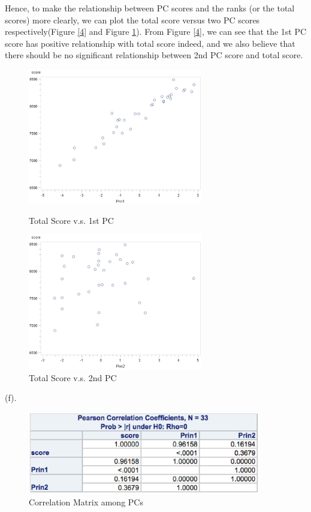 \documentclass[letterpaper, 12pt]{article}
\begin{document}
Hence, to make the relationship between PC scores and the ranks (or the total scores) more clearly, we can plot the total score versus two PC scores respectively(Figure \ref{4} and Figure \ref{5}). From Figure \ref{4}, we can see that the 1st PC score has positive relationship with total score indeed, and we also believe that there should be no significant relationship between 2nd PC score and total score.
\begin{figure}[htbp]
\begin{minipage}[t]{0.5\linewidth}
\centering
\includegraphics[width=3in]{7-4.eps}
\caption{Total Score v.s. 1st PC}\label{4}
\end{minipage}
\begin{minipage}[t]{0.5\linewidth}
\centering
\includegraphics[width=3in]{7-5.eps}
\caption{Total Score v.s. 2nd PC}\label{5}
\end{minipage}
\end{figure}


(f). \begin{figure}[htbp]
\centering\includegraphics[width=4in]{77.eps}
\caption{Correlation Matrix among PCs}
\end{figure}
\end{document}
